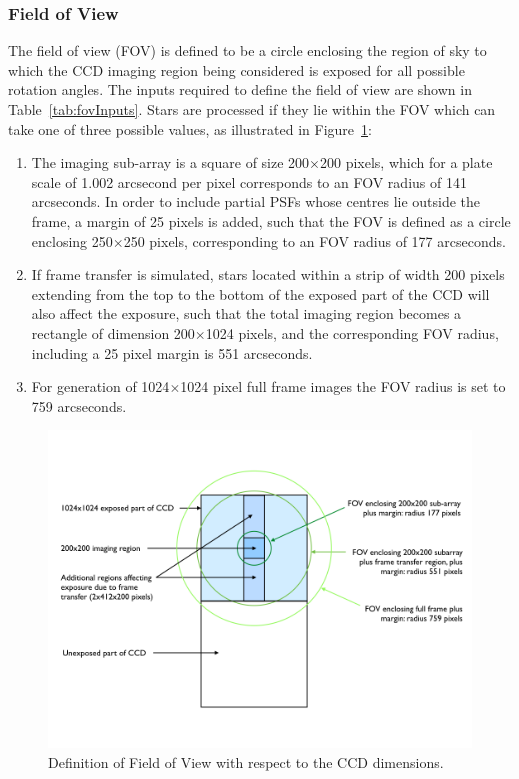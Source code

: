 \documentclass[11pt]{article}      %
\begin{document}
\subsubsection{Field of View}
\label{sec:fov}
The field of view (FOV) is defined to be a circle enclosing the region of sky to which the CCD imaging region being considered is exposed for all possible rotation angles. The inputs required to define the field of view are shown in Table~\ref{tab:fovInputs}.
Stars are processed if they lie within the FOV which can take one of three possible values, as illustrated in Figure~\ref{fig:fov}:
\begin {enumerate}
\item The imaging sub-array is a square of size 200$\times$200 pixels, which for a plate scale of 1.002 arcsecond per pixel corresponds to an FOV radius of 141 arcseconds.  In order to include partial PSFs whose centres lie outside the frame, a margin of 25 pixels is added, such that the FOV is defined as a circle enclosing 250$\times$250 pixels, corresponding to an FOV radius of 177 arcseconds.
\item If frame transfer is simulated, stars located within a strip of width 200 pixels extending from the top to the bottom of the exposed part of the CCD will also affect the exposure, such that the total imaging region becomes a rectangle of dimension 200$\times$1024 pixels, and the corresponding FOV radius, including a 25 pixel margin is 551 arcseconds.
\item For generation of 1024$\times$1024 pixel full frame images the FOV radius is set to 759 arcseconds.
\end{enumerate}

\begin{figure}[hbtp]
  \begin{center}
    \includegraphics[width=\textwidth]{fov.png}
    \caption{Definition of Field of View with respect to the CCD dimensions.}
    \label{fig:fov}
  \end{center}
\end{figure}
\end{document}
